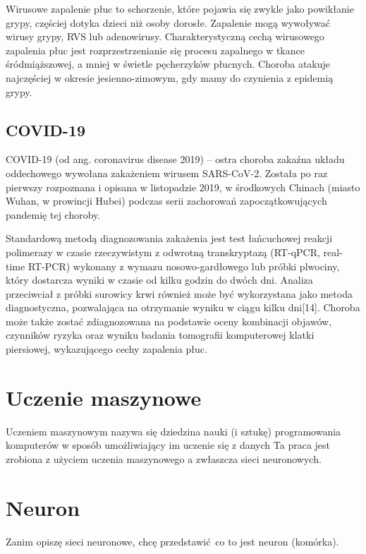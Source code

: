 \documentclass{article}
\begin{document}
Wirusowe zapalenie płuc to schorzenie, które pojawia się zwykle jako powikłanie grypy, częściej dotyka dzieci niż osoby dorosłe. Zapalenie mogą wywoływać wirusy grypy, RVS lub adenowirusy. Charakterystyczną cechą wirusowego zapalenia płuc jest rozprzestrzenianie się procesu zapalnego w tkance śródmiąższowej, a mniej w świetle pęcherzyków płucnych. Choroba atakuje najczęściej w okresie jesienno-zimowym, gdy mamy do czynienia z epidemią grypy.

\subsection{COVID-19}
COVID-19 (od ang. coronavirus disease 2019) – ostra choroba zakaźna układu oddechowego wywołana zakażeniem wirusem SARS-CoV-2. Została po raz pierwszy rozpoznana i opisana w listopadzie 2019, w środkowych Chinach (miasto Wuhan, w prowincji Hubei) podczas serii zachorowań zapoczątkowujących pandemię tej choroby.

Standardową metodą diagnozowania zakażenia jest test łańcuchowej reakcji polimerazy w czasie rzeczywistym z odwrotną transkryptazą (RT-qPCR, real-time RT-PCR) wykonany z wymazu nosowo-gardłowego lub próbki plwociny, który dostarcza wyniki w czasie od kilku godzin do dwóch dni. Analiza przeciwciał z próbki surowicy krwi również może być wykorzystana jako metoda diagnostyczna, pozwalająca na otrzymanie wyniku w ciągu kilku dni[14]. Choroba może także zostać zdiagnozowana na podstawie oceny kombinacji objawów, czynników ryzyka oraz wyniku badania tomografii komputerowej klatki piersiowej, wykazującego cechy zapalenia płuc.

\section{Uczenie maszynowe}
Uczeniem maszynowym nazywa się dziedzina nauki (i sztukę) programowania komputerów w sposób umożliwiający im uczenie się z danych \cite{geron} 
Ta praca jest zrobiona z użyciem uczenia maszynowego a zwłaszcza sieci neuronowych.


\section{Neuron}
Zanim opiszę sieci neuronowe, chcę przedstawić co to jest neuron (komórka).
\end{document}
